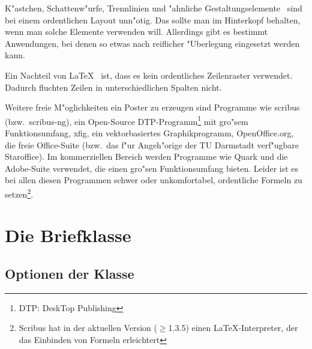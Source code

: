 \documentclass[twoside,colorback,accentcolor=tud4c,11pt]{tudreport}
\begin{document}
    K"astchen, Schattenw"urfe, Trennlinien und "ahnliche 
    \glqq Gestaltungselemente\grqq~ sind bei einem ordentlichen Layout unn"otig.
    Das sollte man im Hinterkopf behalten, wenn man solche Elemente verwenden
    will. Allerdings gibt es bestimmt Anwendungen, bei denen so etwas nach
    reiflicher "Uberlegung eingesetzt werden kann.

    Ein Nachteil von \LaTeX~ ist, dass es kein ordentliches Zeilenraster
    verwendet. Dadurch fluchten Zeilen in unterschiedlichen Spalten nicht.

    Weitere freie M"oglichkeiten ein Poster zu erzeugen sind Programme wie scribus
    (bzw.\ scribus-ng), ein Open-Source DTP-Programm\footnote{DTP: DeskTop
    Publishing} mit gro"sem Funktionsumfang, xfig, ein vektorbasiertes
    Graphikprogramm, OpenOffice.org, die freie Office-Suite (bzw.\ das f"ur
    Angeh"orige der TU Darmstadt verf"ugbare Staroffice). Im kommerziellen Bereich werden
    Programme wie Quark und die Adobe-Suite verwendet, die einen gro"sen
    Funktionsumfang bieten. Leider ist es bei allen diesen Programmen schwer
    oder unkomfortabel, ordentliche Formeln zu setzen\footnote{Scribus hat in
    der aktuellen Version ($\ge$1.3.5) einen \LaTeX-Interpreter, der das Einbinden von Formeln
    erleichtert}.

\chapter{Die Briefklasse \texorpdfstring{}{tudletter}}\label{chap:tudletter}
  \section{Optionen der Klasse \texorpdfstring{}{tudletter}}
    
\end{document}
